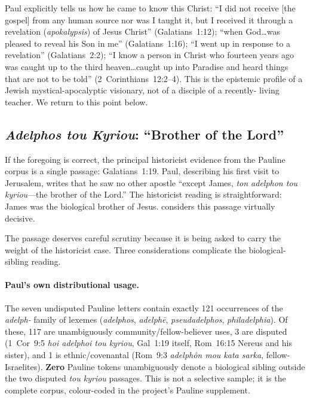 \documentclass[12pt,oneside]{article}
\newcommand{\grk}[1]{\textit{#1}}
\begin{document}
Paul explicitly tells us how he came to know this Christ:
\enquote{I did not receive [the gospel] from any human source nor
was I taught it, but I received it through a revelation
(\grk{apokalypsis}) of Jesus Christ} (Galatians~1:12);
\enquote{when God\ldots was pleased to reveal his Son in me}
(Galatians~1:16); \enquote{I went up in response to a revelation}
(Galatians~2:2); \enquote{I know a person in Christ who fourteen
years ago was caught up to the third heaven\ldots caught up into
Paradise and heard things that are not to be told}
(2~Corinthians~12:2--4).  This is the epistemic profile of a Jewish
mystical-apocalyptic visionary, not of a disciple of a recently-
living teacher.  We return to this point below.

\subsection{\textit{Adelphos tou Kyriou}: \enquote{Brother of the Lord}}

If the foregoing is correct, the principal historicist evidence
from the Pauline corpus is a single passage: Galatians~1:19.
Paul, describing his first visit to Jerusalem, writes that he saw
no other apostle \enquote{except James, \grk{ton adelphon tou
kyriou}---the brother of the Lord.}  The historicist reading is
straightforward: James was the biological brother of Jesus.
\citet{Ehrman2012} considers this passage virtually decisive.

The passage deserves careful scrutiny because it is being asked to
carry the weight of the historicist case.  Three considerations
complicate the biological-sibling reading.

\paragraph{Paul's own distributional usage.}
The seven undisputed Pauline letters contain exactly 121 occurrences
of the \grk{adelph-} family of lexemes (\grk{adelphos},
\grk{adelph\=e}, \grk{pseudadelphos}, \grk{philadelphia}).  Of
these, 117 are unambiguously community/fellow-believer uses, 3 are
disputed (1~Cor~9:5 \grk{hoi adelphoi tou kyriou}, Gal~1:19 itself,
Rom~16:15 Nereus and his sister), and 1 is ethnic/covenantal
(Rom~9:3 \grk{adelph\^on mou kata sarka}, fellow-Israelites).
\textbf{Zero} Pauline tokens unambiguously denote a biological
sibling outside the two disputed \grk{tou kyriou} passages.  This
is not a selective sample; it is the complete corpus, colour-coded
in the project's Pauline supplement.
\end{document}
